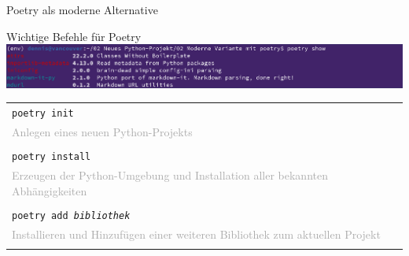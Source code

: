 {{\begin{frame}{Poetry als moderne Alternative}
\end{frame}
}

{
\tiny

\begin{frame}[fragile]{Wichtige Befehle für Poetry}
    \includegraphics[width=\textwidth]{img/poetry-show}


    {

    \begin{tabular}{|p{}|}
        \hline

        \cellcolor{gray!15}
        \texttt{poetry init} \\
        \cellcolor{gray!15}
        \textcolor{darkgray}{Anlegen eines neuen Python-Projekts} \\

        \cellcolor{gray!7}
        \\

        \cellcolor{gray!15}
        \texttt{poetry install} \\
        \cellcolor{gray!15}
        \textcolor{darkgray}{Erzeugen der Python-Umgebung und Installation aller bekannten Abhängigkeiten} \\

        \cellcolor{gray!7}
        \\

        \cellcolor{gray!15}
        \texttt{poetry add \textit{bibliothek}} \\
        \cellcolor{gray!15}
        \textcolor{darkgray}{Installieren und Hinzufügen einer weiteren Bibliothek zum aktuellen Projekt} \\

        \cellcolor{gray!7}
        \\


\end{tabular}}
\end{frame}}}
